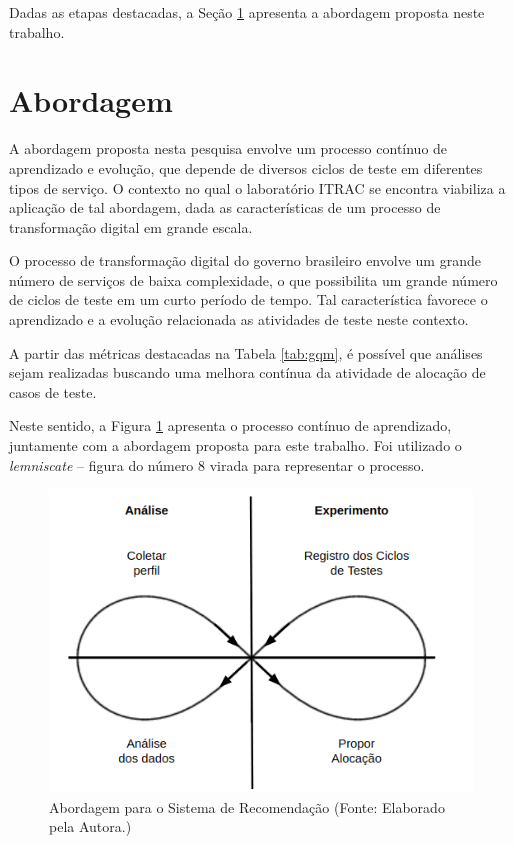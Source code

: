 Dadas as etapas destacadas, a Seção \ref{sec:abordagem} apresenta a abordagem proposta neste trabalho.

\section{Abordagem}
\label{sec:abordagem}

A abordagem proposta nesta pesquisa envolve um processo contínuo de aprendizado e evolução, que depende de diversos ciclos de teste em diferentes tipos de serviço. O contexto no qual o laboratório ITRAC se encontra viabiliza a aplicação de tal abordagem, dada as características de um processo de transformação digital em grande escala. 
        
O processo de transformação digital do governo brasileiro envolve um grande número de serviços de baixa complexidade, o que possibilita um grande número de ciclos de teste em um curto período de tempo. Tal característica favorece o aprendizado e a evolução relacionada as atividades de teste neste contexto. 
		
A partir das métricas destacadas na Tabela \ref{tab:gqm}, é possível que análises sejam realizadas buscando uma melhora contínua da atividade de alocação de casos de teste.

Neste sentido, a Figura \ref{fig:Abordagem} apresenta o processo contínuo de aprendizado, juntamente com a abordagem proposta para este trabalho. Foi utilizado o \textit{lemniscate} – figura do número 8 virada para representar o processo.

        \begin{figure}[h]
          \centering
          \includegraphics[width=13cm]{figuras/abordagem.png}
          \caption{Abordagem para o Sistema de Recomendação  (Fonte: Elaborado pela Autora.)} 
          \label{fig:Abordagem}
        
        \end{figure}		
		
